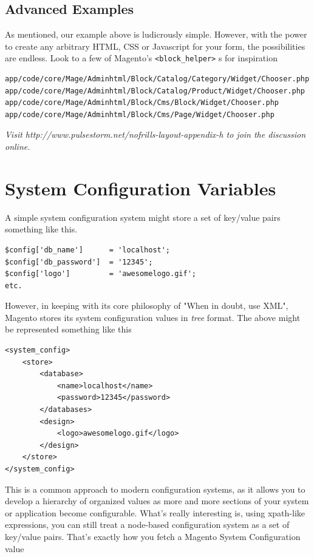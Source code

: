 \documentclass[oneside]{book}
\begin{document}
\section{Advanced Examples}

As mentioned, our example above is ludicrously simple.  However, with the power to create any arbitrary HTML, CSS or Javascript for your form, the possibilities are endless.  Look to a few of Magento's \footnotesize\texttt{\textless block\_helper\textgreater } \normalsize s for inspiration

\begin{lstlisting}
app/code/core/Mage/Adminhtml/Block/Catalog/Category/Widget/Chooser.php
app/code/core/Mage/Adminhtml/Block/Catalog/Product/Widget/Chooser.php   
app/code/core/Mage/Adminhtml/Block/Cms/Block/Widget/Chooser.php
app/code/core/Mage/Adminhtml/Block/Cms/Page/Widget/Chooser.php

\end{lstlisting}


\emph{Visit http://www.pulsestorm.net/nofrills-layout-appendix-h to join the discussion online.}
\chapter{System Configuration Variables}
A simple system configuration system might store a set of key/value pairs something like this.

\begin{lstlisting}
$config['db_name']      = 'localhost';
$config['db_password']  = '12345';  
$config['logo']         = 'awesomelogo.gif';        
etc.

\end{lstlisting}


However, in keeping with its core philosophy of "When in doubt, use XML", Magento stores its system configuration values in \emph{tree} format.  The above might be represented something like this

\begin{lstlisting}
<system_config>
    <store>
        <database>
            <name>localhost</name>
            <password>12345</password>
        </databases>
        <design>
            <logo>awesomelogo.gif</logo>
        </design>
    </store>
</system_config>

\end{lstlisting}


This is a common approach to modern configuration systems, as it allows you to develop a hierarchy of organized values as more and more sections of your system or application become configurable.  What's really interesting is, using xpath-like expressions, you can still treat a node-based configuration system as a set of key/value pairs.  That's exactly how you fetch a Magento System Configuration value
\end{document}
